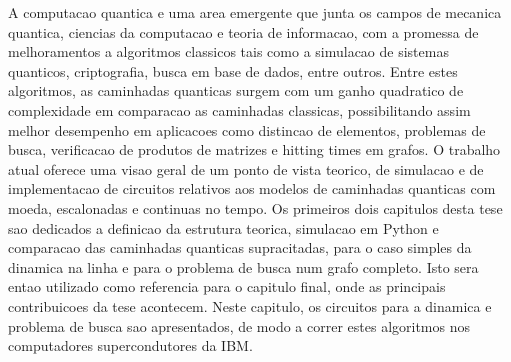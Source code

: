 \documentclass[../../dissertation.tex]{subfiles}
\begin{document}
A computacao quantica e uma area emergente que junta os campos de mecanica
quantica, ciencias da computacao e teoria de informacao, com a promessa de
melhoramentos a algoritmos classicos tais como a simulacao de sistemas
quanticos, criptografia, busca em base de dados, entre outros. Entre estes
algoritmos, as caminhadas quanticas surgem com um ganho quadratico de
complexidade em comparacao as caminhadas classicas, possibilitando assim melhor
desempenho em aplicacoes como distincao de elementos, problemas de busca,
verificacao de produtos de matrizes e hitting times em grafos. O trabalho atual
oferece uma visao geral de um ponto de vista teorico, de simulacao e de
implementacao de circuitos relativos aos modelos de caminhadas quanticas com
moeda, escalonadas e continuas no tempo. Os primeiros dois capitulos desta tese
sao dedicados a definicao da estrutura teorica, simulacao em Python e
comparacao das caminhadas quanticas supracitadas, para o caso simples da
dinamica na linha e para o problema de busca num grafo completo. Isto sera
entao utilizado como referencia para o capitulo final, onde as principais
contribuicoes da tese acontecem. Neste capitulo, os circuitos para a dinamica e
problema de busca sao apresentados, de modo a correr estes algoritmos nos
computadores supercondutores da IBM. 
\end{document}
